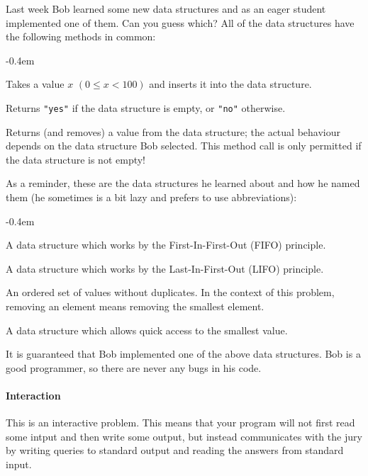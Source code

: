 



\makeheader

Last week Bob learned some new data structures and as an eager student
implemented one of them. Can you guess which? All of the data structures have
the following methods in common:

\begin{description}
	\itemsep-0.4em
	\item[insert:] Takes a value $x$ $(0 \leq x < 100)$ and inserts it into the data structure.
	\item[empty:] Returns \texttt{"yes"} if the data structure is empty, or \texttt{"no"} otherwise.
	\item[remove:] Returns (and removes) a value from the data structure; the
		actual behaviour depends on the data structure Bob selected. This method
		call is only permitted if the data structure is not empty!
\end{description}

As a reminder, these are the data structures he learned about and how he named them (he sometimes is a bit lazy and prefers to use abbreviations):
\begin{description}
	\itemsep-0.4em
	\item[queue:] A data structure which works by the First-In-First-Out (FIFO) principle.
	\item[stack:] A data structure which works by the Last-In-First-Out (LIFO) principle.
	\item[set:] An ordered set of values without duplicates. In the context of this problem, removing an element means removing the smallest element.
	\item[pq:] A data structure which allows quick access to the smallest value.
\end{description}

It is guaranteed that Bob implemented one of the above data structures.
Bob is a good programmer, so there are never any bugs in his code.


\paragraph*{Interaction}

This is an interactive problem. This means that your program will not first
read some intput and then write some output, but instead communicates with
the jury by writing queries to standard output and reading the answers from
standard input.

